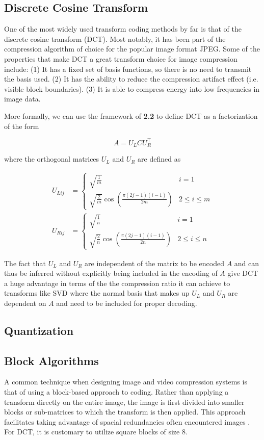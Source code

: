 \documentclass[review,onefignum,onetabnum]{siamart190516}
\begin{document}
\subsection{Discrete Cosine Transform}
One of the most widely used transform coding methods by far is that of the discrete
cosine transform (DCT). Most notably, it has been part of the compression algorithm
of choice for the popular image format JPEG. Some of the properties that make DCT
a great transform choice for image compression include: (1) It has a fixed set of
basis functions, so there is no need to transmit the basis used. (2) It has the 
ability to reduce the compression artifact effect (i.e. visible block boundaries).
(3) It is able to compress energy into low frequencies in image data. \cite{reininger1983distributions}
\cite{ahmed1974discrete}

More formally, we can use the framework of \textbf{2.2} to define DCT as a 
factorization of the form

\[
  A = U_L C U_R^\top
\]

where the orthogonal matrices $U_L$ and $U_R$ are defined as 

\begin{align*}
  U_{Lij} &= \begin{cases}
    \sqrt{\frac{1}{m}} & i = 1 \\
    \sqrt{\frac{2}{m}} \cos(\frac{\pi (2j - 1)(i - 1)}{2m}) & 2 \leq i \leq m
  \end{cases} \\
  U_{Rij} &= \begin{cases}
    \sqrt{\frac{1}{n}} & i = 1 \\
    \sqrt{\frac{2}{n}} \cos(\frac{\pi (2j - 1)(i - 1)}{2n}) & 2 \leq i \leq n
  \end{cases}
\end{align*}

The fact that $U_L$ and $U_R$ are independent of the matrix to be encoded $A$ and
can thus be inferred without explicitly being included in the encoding of $A$
give DCT a huge advantage in terms of the the compression ratio it can achieve
to transforms like SVD where the normal basis that makes up $U_L$ and $U_R$ are
dependent on $A$ and need to be included for proper decoding.

\subsection{Quantization}

\subsection{Block Algorithms}
A common technique when designing image and video compression systems is that of
using a block-based approach to coding. Rather than applying a transform directly
on the entire image, the image is first divided into smaller blocks or sub-matrices
to which the transform is then applied. This approach facilitates taking advantage of
spacial redundancies often encountered images \cite{ahmed1974discrete}. For DCT, 
it is customary to utilize square blocks of size 8.
\end{document}
